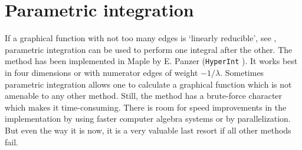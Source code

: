 \documentclass[oneside]{amsart}
\theoremstyle{plain}
\begin{document}
\section{Parametric integration}\label{sectparint}
If a graphical function with not too many edges is `linearly reducible', see \cite{BrH1,BrH2}, parametric integration can be used to perform one integral after the other.
The method has been implemented in Maple by E. Panzer ({\tt HyperInt} \cite{Panzer:HyperInt}). It works best in four dimensions or with numerator edges of weight $-1/\lambda$.
Sometimes parametric integration allows one to calculate a graphical function which is not amenable to any other method.
Still, the method has a brute-force character which makes it time-consuming. There is room for speed improvements in the implementation by using faster computer algebra
systems or by parallelization. But even the way it is now, it is a very valuable last resort if all other methods fail.

\end{document}
